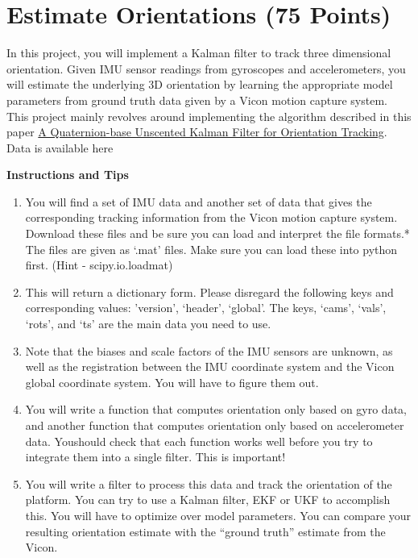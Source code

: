 \documentclass{article}
\begin{document}
\section{Estimate Orientations (75 Points)}
In this project, you will implement a Kalman filter to track three dimensional orientation. Given IMU  sensor  readings  from  gyroscopes  and  accelerometers,  you  will  estimate  the  underlying  3D orientation  by  learning  the  appropriate  model  parameters  from  ground  truth  data  given  by  a Vicon motion capture system. \\

This project mainly revolves around implementing the algorithm described in this paper \color{blue}\href{https://pdfs.semanticscholar.org/3085/aa4779c04898685c1b2d50cdafa98b132d3f.pdf}{A Quaternion-base Unscented Kalman Filter for Orientation Tracking}.\\

\color{black}
Data is available here \\

\color{black} 

\textbf{Instructions and Tips}

\begin{enumerate}
    \item You  will  find  a  set  of  IMU  data and another set of data that gives the  corresponding tracking information from the Vicon motion capture system. Download these files and be sure you can load and interpret the file formats.* The files are given as ‘.mat’ files. Make sure you can load these into python first. (Hint - scipy.io.loadmat)
    \item This will return a dictionary form. Please disregard the following keys and corresponding values: 'version’, ‘header’, ‘global’. The keys, ‘cams’, ‘vals’, ‘rots’, and ‘ts’ are the main data you need to use.
    \item Note that the biases and scale factors of the IMU sensors are unknown, as well  as  the  registration  between  the  IMU  coordinate  system  and  the  Vicon  global  coordinate  system. You will have to figure them out.
    \item You  will  write  a  function  that  computes  orientation  only  based  on gyro data, and another function that computes orientation only based on accelerometer data. Youshould check  that  each  function  works  well  before  you  try  to  integrate  them  into  a  single  filter.  This  is important!
    \item You will write a filter to process this data and track the orientation of the platform. You  can  try  to  use  a  Kalman  filter,  EKF  or  UKF  to  accomplish  this.  You  will  have  to  optimize  over model parameters. You can compare your resulting orientation estimate with the “ground truth” estimate from the Vicon. 
\end{enumerate}
\end{document}
